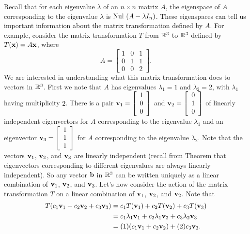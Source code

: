 Recall that for each eigenvalue $\lambda$ of an $n \times n$ matrix $A$, the eigenspace of $A$ corresponding to the eigenvalue $\lambda$ is $\text{Nul } (A - \lambda I_n)$. These eigenspaces can tell us important information about the matrix transformation defined by $A$. For example, consider the matrix transformation $T$ from $\mathbb{R}^3$ to $\mathbb{R}^3$ defined by $T(\mathbf{x}) = A \mathbf{x}$, where
\[A = \left[ \begin{array}{ccc} 1&0&1\\0&1&1\\0&0&2 \end{array} \right].\]
We are interested in understanding what this matrix transformation does to vectors in $\mathbb{R}^3$. First we note that $A$ has eigenvalues $\lambda_1 = 1$ and $\lambda_2 = 2$, with $\lambda_1$ having multiplicity $2$. There is a pair $\mathbf{v}_1 = \left[ \begin{array}{c} 1\\0\\0 \end{array} \right]$ and $\mathbf{v}_2 = \left[ \begin{array}{c} 0\\1\\0 \end{array} \right]$ of linearly independent eigenvectors for $A$ corresponding to the eigenvalue $\lambda_1$ and an eigenvector $\mathbf{v}_3=\left[ \begin{array}{c} 1\\1\\1 \end{array} \right]$ for $A$ corresponding to the eigenvalue $\lambda_2$. Note that the vectors $\mathbf{v}_1$, $\mathbf{v}_2$, and $\mathbf{v}_3$ are linearly independent (recall from Theorem \label{thm:4_b_lin_indep_evects} that eigenvectors corresponding to different eigenvalues are always linearly independent). So any vector $\mathbf{b}$ in $\mathbb{R}^3$ can be written uniquely as a linear combination of $\mathbf{v}_1$, $\mathbf{v}_2$, and $\mathbf{v}_3$. Let's now consider the action of the matrix transformation $T$ on a linear combination of $\mathbf{v}_1$, $\mathbf{v}_2$, and $\mathbf{v}_2$. Note that 
\begin{align} 
T(c_1\mathbf{v}_1 + c_2 \mathbf{v}_2 + c_3 \mathbf{v}_3) &= c_1T(\mathbf{v}_1) + c_2T(\mathbf{v}_2) + c_3 T(\mathbf{v}_3) \notag \\
	&= c_1 \lambda_1 \mathbf{v}_1 + c_2 \lambda_1 \mathbf{v}_2 + c_3 \lambda_2 \mathbf{v}_3 \notag \\
	&= (1)(c_1\mathbf{v}_1 + c_2 \mathbf{v}_2) + (2)c_3 \mathbf{v}_3. \label{eq:4_b_2}
\end{align}
